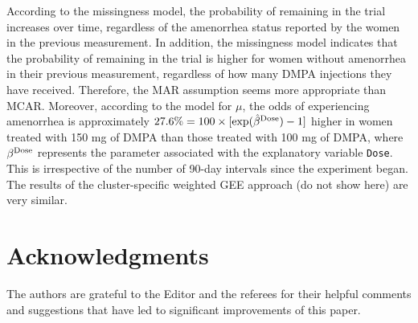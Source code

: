 According to the missingness model, the probability of remaining in the trial increases over time, regardless of the amenorrhea status reported by the women in the previous measurement. In addition, the missingness model indicates that the probability of remaining in the trial is higher for women without amenorrhea in their previous measurement, regardless of how many DMPA injections they have received. Therefore, the MAR assumption seems more appropriate than MCAR. Moreover, according to the model for $\mu$, the odds of experiencing amenorrhea is approximately $27.6\%=100\times[\exp(\hat{\beta}^{\rm Dose})-1]$ higher in women treated with 150 mg of DMPA than those treated with 100 mg of DMPA, where ${\beta}^{\rm Dose}$ represents the parameter associated with the explanatory variable {\tt Dose}. This is irrespective of the number of 90-day intervals since the experiment began. The results of the cluster-specific weighted GEE approach (do not show here) are very similar.

\section*{Acknowledgments}
The authors are grateful to the Editor and the referees for their helpful comments and suggestions that have led to significant improvements of this paper.

